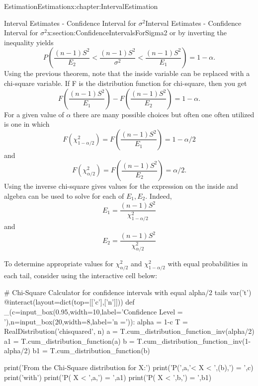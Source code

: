 \documentclass[oneside,10pt,]{book}
\numberwithin{equation}{section}
\newcommand{\lt}{<}
\begin{document}
\begin{chapterptx}{Estimation}{}{Estimation}{}{}{x:chapter:IntervalEstimation}
\begin{sectionptx}{Interval Estimates - Confidence Interval for \(\sigma^2\)}{}{Interval Estimates - Confidence Interval for \(\sigma^2\)}{}{}{x:section:ConfidenceIntervalsForSigma2}
or by inverting the inequality yields%
\begin{equation*}
P \left ( \frac{(n-1)S^2}{E_2} \lt \frac{(n-1)S^2}{\sigma^2} \lt \frac{(n-1)S^2}{E_1} \right ) = 1 - \alpha .
\end{equation*}
Using the previous theorem, note that the inside variable can be replaced with a chi-square variable. If F is the distribution function for chi-square, then you get%
\begin{equation*}
F \left ( \frac{(n-1)S^2}{E_1} \right ) - F \left ( \frac{(n-1)S^2}{E_2} \right ) = 1 - \alpha .
\end{equation*}
For a given value of \(\alpha\) there are many possible choices but often one often utilized is one in which%
\begin{equation*}
F(\chi^2_{1-\alpha/2} ) = F \left ( \frac{(n-1)S^2}{E_1} \right ) = 1 - \alpha / 2
\end{equation*}
and%
\begin{equation*}
F(\chi^2_{\alpha/2} ) = F \left ( \frac{(n-1)S^2}{E_2} \right ) = \alpha / 2.
\end{equation*}
Using the inverse chi-square gives values for the expression on the inside and algebra can be used to solve for each of \(E_1, E_2\). Indeed,%
\begin{equation*}
E_1 = \frac{(n-1)S^2}{\chi^2_{1-\alpha/2}} 
\end{equation*}
and%
\begin{equation*}
E_2 = \frac{(n-1)S^2}{\chi^2_{\alpha/2}} 
\end{equation*}
%
\par
To determine appropriate values for \(\chi^2_{\alpha/2} \) and \(\chi^2_{1-\alpha/2} \) with equal probabilities in each tail, consider using the interactive cell below:%
\begin{sageinput}
# Chi-Square Calculator for confidence intervals with equal alpha/2 tails
var('t')
@interact(layout=dict(top=[['c'],['n']]))
def _(c=input_box(0.95,width=10,label='Confidence Level = '),n=input_box(20,width=8,label='n =')):
    alpha = 1-c
    T = RealDistribution('chisquared', n)
    a = T.cum_distribution_function_inv(alpha/2)
    a1 = T.cum_distribution_function(a)
    b = T.cum_distribution_function_inv(1-alpha/2)
    b1 = T.cum_distribution_function(b)
    
    print('From the Chi-Square distribution for X:')
    print('P(',a,'< X < ',(b),') = ',c)
    print('with')
    print('P( X < ',a,') = ',a1)
    print('P( X < ',b,') = ',b1)
    

\end{sageinput}
\end{sectionptx}
\end{chapterptx}
\end{document}
